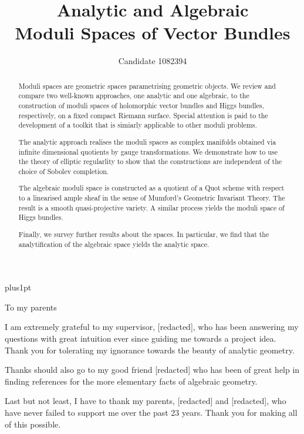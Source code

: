 \documentclass[12pt]{ociamthesis}  %
\title{Analytic and Algebraic\\[1ex]Moduli Spaces of Vector Bundles}   %
\author{Candidate 1082394}             %
\begin{document}
\baselineskip=18pt plus1pt

\setcounter{secnumdepth}{3}
\setcounter{tocdepth}{3}


\maketitle                  %
\begin{dedication}
  To my parents 
\end{dedication}

\begin{acknowledgements}
  I am extremely grateful to my supervisor, [redacted],
  who has been answering my questions with great intuition ever since
  guiding me towards a project idea. Thank you for tolerating my
  ignorance towards the beauty of analytic geometry.

  Thanks should also go to my good friend [redacted] who has
  been of great help in finding references for the more elementary
  facts of algebraic geometry.

  Last but not least, I have to thank my parents,
  [redacted] and [redacted], who have never
  failed to support me over the past 23 years. Thank you for
  making all of this possible.
\end{acknowledgements}

\begin{abstract}
  Moduli spaces are geometric spaces parametrising geometric objects.  We review
  and compare two well-known approaches, one analytic and one algebraic, to the
  construction of moduli spaces of holomorphic vector bundles and Higgs bundles,
  respectively, on a fixed compact Riemann surface. Special attention
  is paid to the development of a toolkit that is simiarly applicable to
  other moduli problems.

  The analytic approach realises the moduli spaces as complex
  manifolds obtained via infinite dimensional quotients by gauge
  transformations. We demonstrate how to use the theory of elliptic
  regularlity to show that the constructions are independent
  of the choice of Sobolev completion.

  The algebraic moduli space is constructed as a quotient of a
  Quot scheme with respect to a linearised ample sheaf in the
  sense of Mumford's Geometric Invariant Theory. The result is a smooth
  quasi-projective variety. A similar process yields the moduli
  space of Higgs bundles.

  Finally, we survey further results about the spaces. In particular,
  we find that the analytification of the algebraic space yields the
  analytic space.
\end{abstract}
\end{document}
